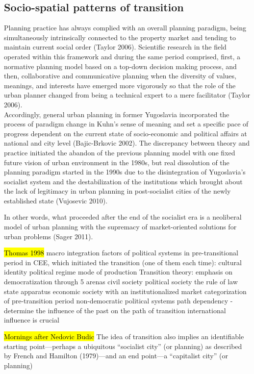 \documentclass[11pt]{report}
\begin{document}
\subsection{Socio-spatial patterns of transition}
Planning practice has always complied with an overall planning paradigm, being simultaneously intrinsically connected to the property market and tending to maintain current social order (Taylor 2006). Scientific research in the field operated within this framework and during the same period comprised, first, a normative planning model based on a top-down decision making process, and then, collaborative and communicative planning when the diversity of values, meanings, and interests have emerged more vigorously so that the role of the urban planner changed from being a technical expert to a mere facilitator (Taylor 2006).
\\
Accordingly, general urban planning in former Yugoslavia incorporated the process of paradigm change in Kuhn’s sense of meaning and set a specific pace of progress dependent on the current state of socio-economic and political affairs at national and city level (Bajic-Brkovic 2002). The discrepancy between theory and practice initiated the abandon of the previous planning model with one fixed future vision of urban environment in the 1980s, but real dissolution of the planning paradigm started in the 1990s due to the disintegration of Yugoslavia’s socialist system and the destabilization of the institutions which brought about the lack of legitimacy in urban planning in post-socialist cities of the newly established state (Vujosevic 2010).

In other words, what proceeded after the end of the socialist era is a neoliberal model of urban planning with the supremacy of market-oriented solutions for urban problems (Sager 2011).

\hl{Thomas 1998}
macro integration factors of political systems in pre-transitional period in CEE, which initiated the transition (one of them each time):
    cultural identity
    political regime
    mode of production
Transition theory:
    emphasis on democratization through 5 arenas
        civil society
        political society
        the rule of law
        state apparatus
        economic society with an institutionalized market
    categorization of pre-transition period
        non-democratic political systems
    path dependency - determine the influence of the past on the path of transition
    international influence is crucial

\hl{Mornings after Nedovic Budic}
The idea of transition also implies an identiﬁable starting point—perhaps a ubiquitous “socialist city” (or planning) as described by French and Hamilton (1979)—and an end point—a “capitalist city” (or planning)
\end{document}
